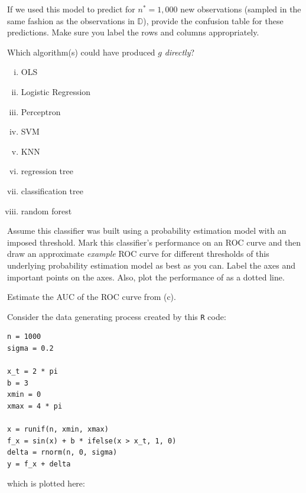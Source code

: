 \documentclass[12pt]{article}
\begin{document}

  If we used this model to predict for $n^*=1,000$ new observations (sampled in the same fashion as the observations in $\mathbb{D}$), provide the confusion table for these predictions. Make sure you label the rows and columns appropriately. 

 Which algorithm(s) could have produced $g$ \textit{directly}?

\begin{enumerate}[i)]
\item OLS
\item Logistic Regression
\item Perceptron
\item SVM
\item KNN
\item regression tree
\item classification tree
\item random forest
\end{enumerate}

 Assume this classifier was built using a probability estimation model with an imposed threshold. Mark this classifier's performance on an ROC curve and then draw an approximate \textit{example} ROC curve for different thresholds of this underlying probability estimation model as best as you can. Label the axes and important points on the axes. Also, plot the performance of  as a dotted line.

 Estimate the AUC of the ROC curve from (c).
\eenum


\pagebreak
\problem Consider the data generating process created by this \texttt{R} code:\\


\begin{lstlisting}
n = 1000
sigma = 0.2

x_t = 2 * pi
b = 3
xmin = 0
xmax = 4 * pi

x = runif(n, xmin, xmax)
f_x = sin(x) + b * ifelse(x > x_t, 1, 0)
delta = rnorm(n, 0, sigma)
y = f_x + delta
\end{lstlisting}

\noindent which is plotted here:
\end{document}
